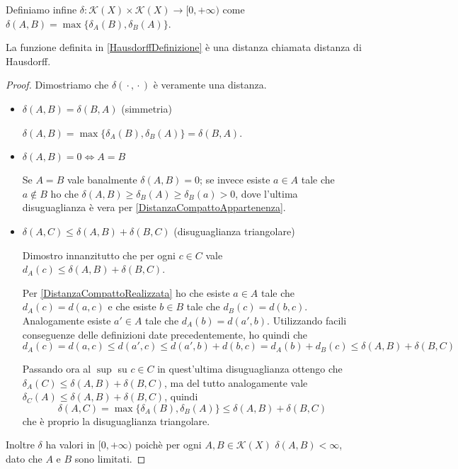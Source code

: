 \begin{definition}\label{HausdorffDefinizione}
	Definiamo infine $\delta:\mathcal{K}(X)\times \mathcal{K}(X) \to [0,+\infty)$ come $\delta(A,B)=\max\{ \delta_A(B),\delta_B(A) \}$.
\end{definition}

\begin{theorem}
	La funzione definita in \cref{HausdorffDefinizione} è una distanza chiamata distanza di Hausdorff.
\end{theorem}

\begin{proof}
	Dimostriamo che $\delta({}\cdot{},{}\cdot{})$ è veramente una distanza.
	\begin{itemize}
		\item $\delta(A,B)=\delta(B,A)$ (simmetria)
		
		$\delta(A,B)=\max\{ \delta_A(B),\delta_B(A) \}=\delta(B,A)$.
		\item $\delta(A,B)=0 \iff A=B$
		
		Se $A=B$ vale banalmente $\delta(A,B)=0$; se invece esiste $a\in A$ tale che $a\not\in B$ ho che $\delta(A,B)\ge \delta_B(A)\ge \delta_B(a)>0$, dove l'ultima disuguaglianza è vera per \cref{DistanzaCompattoAppartenenza}.
		\item $\delta(A,C)\le \delta(A,B)+\delta(B,C)$ (disuguaglianza triangolare)
		
		Dimostro innanzitutto che per ogni $c\in C$ vale $d_A(c)\le \delta(A,B)+\delta(B,C)$.
		
 		Per \cref{DistanzaCompattoRealizzata} ho che esiste $a\in A$ tale che $d_A(c)=d(a,c)$ e che esiste $b\in B$ tale che $d_B(c)=d(b,c)$. Analogamente esiste $a'\in A$ tale che $d_A(b)=d(a',b)$. Utilizzando facili conseguenze delle definizioni date precedentemente, ho quindi che 
 		\begin{equation*}
 			d_A(c)=d(a,c)\le d(a',c) \le d(a',b)+d(b,c)=d_A(b)+d_B(c)\le \delta(A,B)+\delta(B,C)
 		\end{equation*}
 		
 		Passando ora al $\sup$ su $c\in C$ in quest'ultima disuguaglianza ottengo che $\delta_A(C)\le \delta(A,B)+\delta(B,C)$, ma del tutto  analogamente vale $\delta_C(A)\le \delta(A,B)+\delta(B,C)$, quindi
 		\begin{equation*}
 			\delta(A,C)=\max\{ \delta_A(B),\delta_B(A) \}\le \delta(A,B)+\delta(B,C)
 		\end{equation*}
		che è proprio la disuguaglianza triangolare.
	\end{itemize}
	Inoltre $\delta$ ha valori in $[0,+\infty)$ poichè per ogni $A,B\in \mathcal{K}(X)$ $\delta(A,B)<\infty$, dato che $A$ e $B$ sono limitati.
\end{proof}

